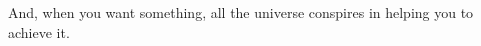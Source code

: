 
%


        
\begin{ntquote}
  And, when you want something, all the universe conspires in helping you to achieve it.%
\end{ntquote}
